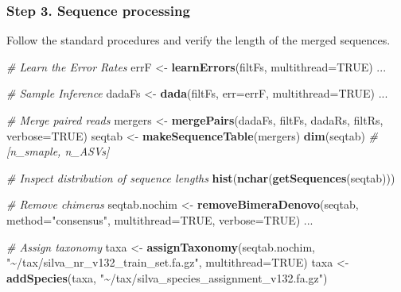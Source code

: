 \documentclass[
]{article}
\newenvironment{Shaded}{\begin{snugshade}}{\end{snugshade}}
\newcommand{\AttributeTok}[1]{\textcolor[rgb]{0.13,0.29,0.53}{#1}}
\newcommand{\CommentTok}[1]{\textcolor[rgb]{0.56,0.35,0.01}{\textit{#1}}}
\newcommand{\ConstantTok}[1]{\textcolor[rgb]{0.56,0.35,0.01}{#1}}
\newcommand{\FunctionTok}[1]{\textcolor[rgb]{0.13,0.29,0.53}{\textbf{#1}}}
\newcommand{\NormalTok}[1]{#1}
\newcommand{\OtherTok}[1]{\textcolor[rgb]{0.56,0.35,0.01}{#1}}
\newcommand{\StringTok}[1]{\textcolor[rgb]{0.31,0.60,0.02}{#1}}
\begin{document}
\hypertarget{step-3.-sequence-processing}{%
\subsubsection{Step 3. Sequence
processing}\label{step-3.-sequence-processing}}

Follow the standard procedures and verify the length of the merged
sequences.

\begin{Shaded}
\begin{Highlighting}[]
\CommentTok{\# Learn the Error Rates}
\NormalTok{errF }\OtherTok{\textless{}{-}} \FunctionTok{learnErrors}\NormalTok{(filtFs, }\AttributeTok{multithread=}\ConstantTok{TRUE}\NormalTok{)}
\NormalTok{...}

\CommentTok{\# Sample Inference}
\NormalTok{dadaFs }\OtherTok{\textless{}{-}} \FunctionTok{dada}\NormalTok{(filtFs, }\AttributeTok{err=}\NormalTok{errF, }\AttributeTok{multithread=}\ConstantTok{TRUE}\NormalTok{)}
\NormalTok{...}

\CommentTok{\# Merge paired reads}
\NormalTok{mergers }\OtherTok{\textless{}{-}} \FunctionTok{mergePairs}\NormalTok{(dadaFs, filtFs, dadaRs, filtRs, }\AttributeTok{verbose=}\ConstantTok{TRUE}\NormalTok{)}
\NormalTok{seqtab }\OtherTok{\textless{}{-}} \FunctionTok{makeSequenceTable}\NormalTok{(mergers)}
\FunctionTok{dim}\NormalTok{(seqtab) }\CommentTok{\# [n\_smaple, n\_ASVs]}

\CommentTok{\# Inspect distribution of sequence lengths}
\FunctionTok{hist}\NormalTok{(}\FunctionTok{nchar}\NormalTok{(}\FunctionTok{getSequences}\NormalTok{(seqtab)))}

\CommentTok{\# Remove chimeras}
\NormalTok{seqtab.nochim }\OtherTok{\textless{}{-}} \FunctionTok{removeBimeraDenovo}\NormalTok{(seqtab, }\AttributeTok{method=}\StringTok{"consensus"}\NormalTok{, }\AttributeTok{multithread=}\ConstantTok{TRUE}\NormalTok{, }\AttributeTok{verbose=}\ConstantTok{TRUE}\NormalTok{)}
\NormalTok{...}

\CommentTok{\# Assign taxonomy}
\NormalTok{taxa }\OtherTok{\textless{}{-}} \FunctionTok{assignTaxonomy}\NormalTok{(seqtab.nochim, }\StringTok{"\textasciitilde{}/tax/silva\_nr\_v132\_train\_set.fa.gz"}\NormalTok{, }\AttributeTok{multithread=}\ConstantTok{TRUE}\NormalTok{)}
\NormalTok{taxa }\OtherTok{\textless{}{-}} \FunctionTok{addSpecies}\NormalTok{(taxa, }\StringTok{"\textasciitilde{}/tax/silva\_species\_assignment\_v132.fa.gz"}\NormalTok{)}
\end{Highlighting}
\end{Shaded}
\end{document}
